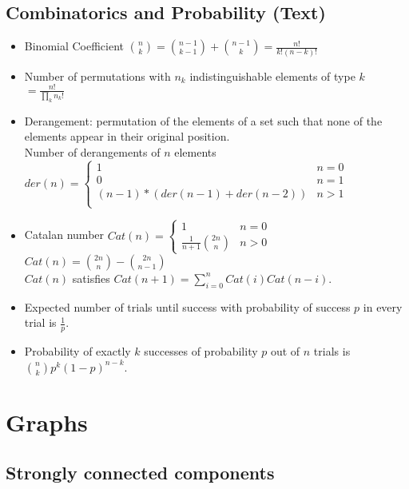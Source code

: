 \documentclass[9pt]{extarticle}
\begin{document}
\begin{multicols*}{3}
\subsection{Combinatorics and Probability (Text)}
\begin{itemize}
\item Binomial Coefficient $\binom{n}{k} = \binom{n - 1}{k - 1} + \binom{n - 1}{k} = \frac{n!}{k!(n - k)!}$
\item Number of permutations with $n_k$ indistinguishable elements of type $k$ $ = \frac{n!}{\prod_{k}n_k!}$
\item Derangement: permutation of the elements of a set such that none of the elements appear in their original position. \\
Number of derangements of $n$ elements \\
$der(n) = \begin{cases}
1 & \text{$n = 0$} \\
0 & \text{$n = 1$} \\
(n - 1) * (der(n - 1) + der(n - 2)) & \text{$n > 1$} \\
\end{cases}$
\item Catalan number $Cat(n) = \begin{cases}
1 & \text{$n = 0$} \\
\frac{1}{n + 1}\binom{2n}{n} & \text{$n > 0$}
\end{cases}$ \\
$Cat(n) = \binom{2n}{n} - \binom{2n}{n - 1}$ \\
$Cat(n)$ satisfies $Cat(n + 1) = \sum_{i = 0}^{n} Cat(i)Cat(n - i)$.
\item Expected number of trials until success with probability of success $p$ in every trial is $\frac{1}{p}$.
\item Probability of exactly $k$ successes of probability $p$ out of $n$ trials is $\binom{n}{k}p^k(1 - p)^{n-k}$.
\end{itemize}

\section{Graphs}

\subsection{Strongly connected components} %



\end{multicols*}
\end{document}
